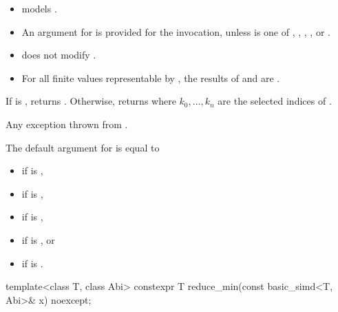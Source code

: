 \begin{itemdescr}
  \pnum\constraints
  \begin{itemize}
    \item {} models .

    \item An argument for  is provided for the invocation, unless
       is one of , , ,
      , or .
  \end{itemize}

  \pnum\expects
  \begin{itemize}
    \item {} does not modify .

    \item For all finite values  representable by , the results of
       and
       are .
  \end{itemize}

  \pnum\returns
  If  is , returns .
  Otherwise, returns  where $k_0, \ldots, k_n$ are the selected indices of
  .

  \pnum\throws
  Any exception thrown from .

  \pnum\remarks
  The default argument for  is equal to
  \begin{itemize}
    \item {} if  is ,
    \item {} if  is ,
    \item {} if  is ,
    \item {} if  is , or
    \item {} if  is .
  \end{itemize}
\end{itemdescr}

\begin{itemdecl}
template<class T, class Abi> constexpr T reduce_min(const basic_simd<T, Abi>& x) noexcept;
\end{itemdecl}

